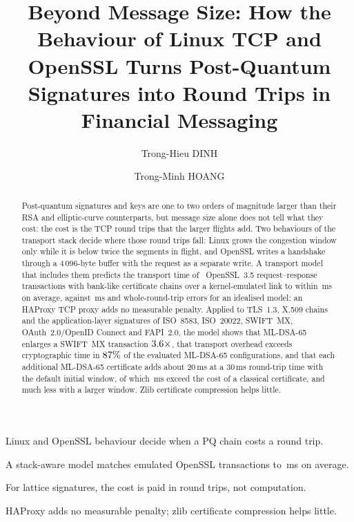 \documentclass[preprint,12pt]{elsarticle}
\newcommand{\ms}{\,ms\xspace}
\begin{document}
\begin{frontmatter}

\title{Beyond Message Size: How the Behaviour of Linux TCP and OpenSSL Turns Post-Quantum Signatures into Round Trips in Financial Messaging}


\author[a]{Trong-Hieu DINH}
\author[b]{Trong-Minh HOANG}



\begin{abstract}
Post-quantum signatures and keys are one to two orders of magnitude larger than their RSA and elliptic-curve counterparts, but message size alone does not tell what they cost: the cost is the TCP round trips that the larger flights add. Two behaviours of the transport stack decide where those round trips fall: Linux grows the congestion window only while it is below twice the segments in flight, and OpenSSL writes a handshake through a 4\,096-byte buffer with the request as a separate write. A transport model that includes them predicts the transport time of \tbNTrans\ OpenSSL~3.5 request--response transactions with bank-like certificate chains over a kernel-emulated link to within \tbMaeStack\ms on average, against \tbMaeIdeal\ms and whole-round-trip errors for an idealised model; an HAProxy TCP proxy adds no measurable penalty. Applied to TLS~1.3, X.509 chains and the application-layer signatures of ISO~8583, ISO~20022, SWIFT~MX, OAuth~2.0/OpenID Connect and FAPI~2.0, the model shows that ML-DSA-65 enlarges a SWIFT~MX transaction $3.6\times$, that transport overhead exceeds cryptographic time in $87\%$ of the evaluated ML-DSA-65 configurations, and that each additional ML-DSA-65 certificate adds about 20\ms at a 30\ms round-trip time with the default initial window, of which \perCertNet\ms exceed the cost of a classical certificate, and much less with a larger window. Zlib certificate compression helps little.
\end{abstract}

\begin{highlights}
\item Linux and OpenSSL behaviour decide when a PQ chain costs a round trip.
\item A stack-aware model matches emulated OpenSSL transactions to \tbMaeStack\ms on average.
\item For lattice signatures, the cost is paid in round trips, not computation.
\item HAProxy adds no measurable penalty; zlib certificate compression helps little.
\end{highlights}


\end{frontmatter}
\end{document}
